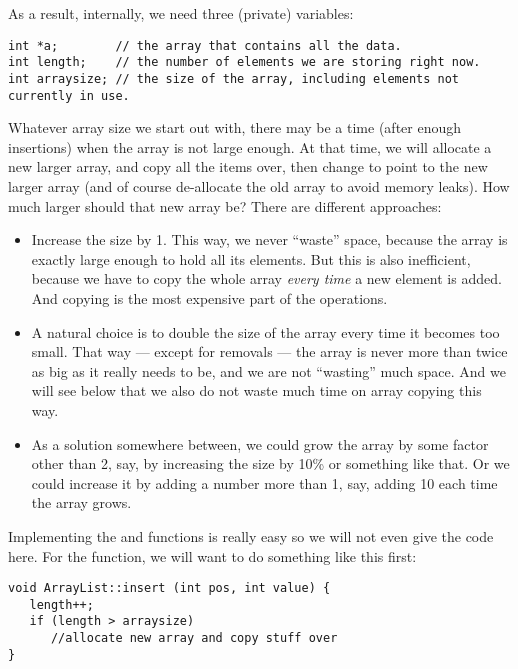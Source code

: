 As a result, internally, we need three (private) variables:

\begin{verbatim}
int *a;        // the array that contains all the data.
int length;    // the number of elements we are storing right now. 
int arraysize; // the size of the array, including elements not currently in use.
\end{verbatim}

Whatever array size we start out with, there may be a time
(after enough insertions) when the array is not large enough.
At that time, we will allocate a new larger array,
and copy all the items over, then change  to point to the new
larger array (and of course de-allocate the old array to avoid memory leaks). 
How much larger should that new array be? There are different approaches:

\begin{itemize}
\item Increase the size by 1. This way, we never ``waste'' space,
  because the array is exactly large enough to hold all its elements.
  But this is also inefficient, because we have to copy the whole
  array \emph{every time} a new element is added.
  And copying is the most expensive part of the operations.
\item A natural choice is to double the size of the array every time
  it becomes too small. That way --- except for removals --- the array
  is never more than twice as big as it really needs to be, and we are
  not ``wasting'' much space. And we will see below that we also do not
  waste much time on array copying this way.
\item As a solution somewhere between, we could grow the array by some
  factor other than 2, say, by increasing the size by 10\% or
  something like that. Or we could increase it by adding a number more
  than 1, say, adding 10 each time the array grows.
\end{itemize}

Implementing the  and  functions is really
easy so we will not even give the code here.
For the  function, we will want to do something like this
first:

\begin{verbatim}
void ArrayList::insert (int pos, int value) {
   length++; 
   if (length > arraysize)
      //allocate new array and copy stuff over
}
\end{verbatim}

